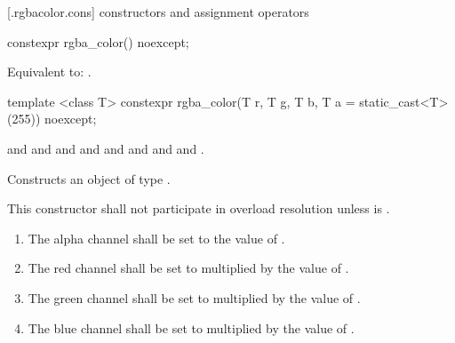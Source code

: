  [\iotwod.rgbacolor.cons] { constructors and assignment operators}

\begin{itemdecl}
constexpr rgba_color() noexcept;
\end{itemdecl}
\begin{itemdescr}
\pnum
\effects
Equivalent to: .
\end{itemdescr}

\begin{itemdecl}
template <class T>
constexpr rgba_color(T r, T g, T b, T a = static_cast<T>(255)) noexcept;
\end{itemdecl}
\begin{itemdescr}
\pnum
\requires
{} and  and  and  and  and  and  and  and .

\pnum
\effects
Constructs an object of type .

\pnum
\remarks
This constructor shall not participate in overload resolution unless  is .
\begin{enumerate}
\item The alpha channel shall be set to the value of .
\item The red channel shall be set to  multiplied by the value of  .
\item The green channel shall be set to  multiplied by the value of .
\item The blue channel shall be set to  multiplied by the value of .
\end{enumerate}
\end{itemdescr}

